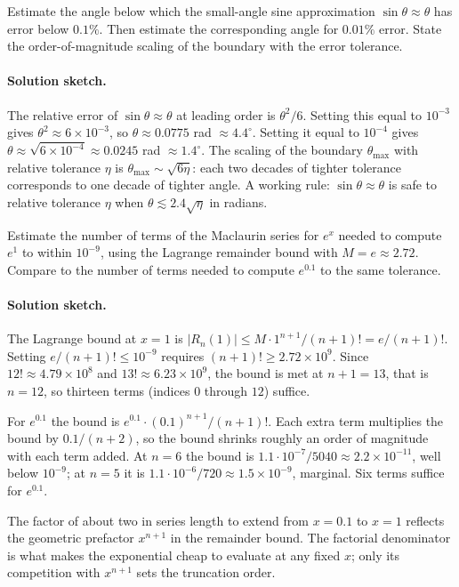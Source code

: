 \begin{exercise}
Estimate the angle below which the small-angle sine approximation
$\sin \theta \approx \theta$ has error below $0.1\%$. Then estimate
the corresponding angle for $0.01\%$ error. State the order-of-magnitude
scaling of the boundary with the error tolerance.

\paragraph{Solution sketch.} The relative error of $\sin\theta
\approx \theta$ at leading order is $\theta^{2}/6$. Setting this
equal to $10^{-3}$ gives $\theta^{2} \approx 6 \times 10^{-3}$, so
$\theta \approx 0.0775$ rad $\approx 4.4^{\circ}$. Setting it equal
to $10^{-4}$ gives $\theta \approx \sqrt{6 \times 10^{-4}} \approx
0.0245$ rad $\approx 1.4^{\circ}$. The scaling of the boundary
$\theta_{\max}$ with relative tolerance $\eta$ is
$\theta_{\max} \sim \sqrt{6 \eta}$: each two decades of tighter
tolerance corresponds to one decade of tighter angle. A working rule:
$\sin\theta \approx \theta$ is safe to relative tolerance $\eta$
when $\theta \lesssim 2.4\sqrt{\eta}$ in radians.
\end{exercise}

\begin{exercise}
Estimate the number of terms of the Maclaurin series for $e^{x}$
needed to compute $e^{1}$ to within $10^{-9}$, using the Lagrange
remainder bound with $M = e \approx 2.72$. Compare to the number of
terms needed to compute $e^{0.1}$ to the same tolerance.
\paragraph{Solution sketch.} The Lagrange bound at $x = 1$ is
$|R_{n}(1)| \leq M \cdot 1^{n+1}/(n+1)! = e/(n+1)!$. Setting
$e/(n+1)! \leq 10^{-9}$ requires $(n+1)! \geq 2.72 \times 10^{9}$.
Since $12! \approx 4.79 \times 10^{8}$ and $13! \approx 6.23 \times
10^{9}$, the bound is met at $n + 1 = 13$, that is $n = 12$, so
thirteen terms (indices $0$ through $12$) suffice.

For $e^{0.1}$ the bound is $e^{0.1} \cdot (0.1)^{n+1}/(n+1)!$. Each
extra term multiplies the bound by $0.1/(n+2)$, so the bound shrinks
roughly an order of magnitude with each term added. At $n = 6$ the
bound is $1.1 \cdot 10^{-7}/5040 \approx 2.2 \times 10^{-11}$, well
below $10^{-9}$; at $n = 5$ it is $1.1 \cdot 10^{-6}/720 \approx
1.5 \times 10^{-9}$, marginal. Six terms suffice for $e^{0.1}$.

The factor of about two in series length to extend from $x = 0.1$
to $x = 1$ reflects the geometric prefactor $x^{n+1}$ in the
remainder bound. The factorial denominator is what makes the
exponential cheap to evaluate at any fixed $x$; only its competition
with $x^{n+1}$ sets the truncation order.
\end{exercise}

